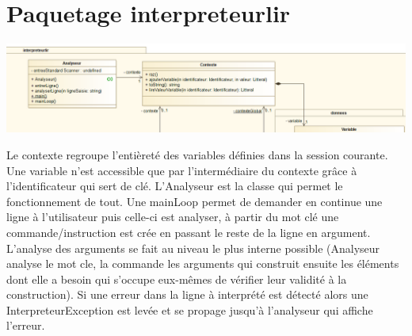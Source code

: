 \section{Paquetage interpreteurlir}
\begin{center}\includegraphics[scale=0.60]{./img/COO/COO_prototype_1/PackageInterpreteurlir}\end{center}
\par Le contexte regroupe l'entièreté des variables définies dans la session courante. Une variable n'est accessible que par l'intermédiaire du contexte grâce à l'identificateur qui sert de clé. L'Analyseur est la classe qui permet le fonctionnement de tout. Une mainLoop permet de demander en continue une ligne à l'utilisateur puis celle-ci est analyser, à partir du mot clé une commande/instruction est crée en passant le reste de la ligne en argument. L'analyse des arguments se fait au niveau le plus interne possible (Analyseur analyse le mot cle, la commande les arguments qui construit ensuite les éléments dont elle a besoin qui s'occupe eux-mêmes de vérifier leur validité à la construction). Si une erreur dans la ligne à interprété est détecté alors une InterpreteurException est levée et se propage jusqu'à l'analyseur qui affiche l'erreur.

